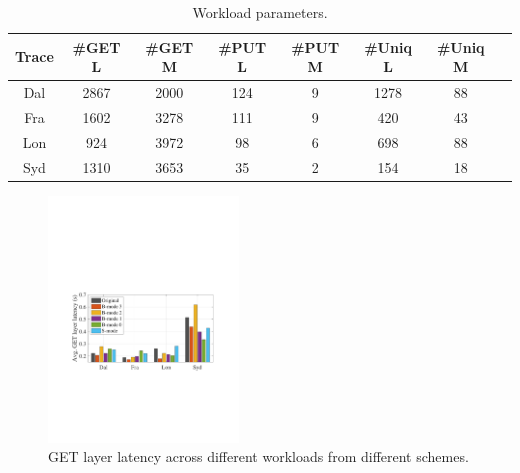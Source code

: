 
\begin{table}[h!]
	\scriptsize
	\caption{Workload parameters.}
	\begin{tabular}{| c | c | c | c | c | c | c| c |} 
		\hline
	Trace    &   \#GET L & \#GET M & \#PUT L & \#PUT M & \#Uniq L & \#Uniq M \\ 
		\hline\hline
		Dal    &  2867  & 2000   & 124  & 9     & 1278 & 88      \\ 
		\hline
		Fra     &  1602  & 3278   & 111  & 9     & 420 & 43     \\
		\hline
		Lon    &  924    & 3972   & 98  & 6      & 698 & 88    \\
		\hline 
		Syd      &  1310   & 3653   & 35 & 2     & 154 & 18      \\  
		\hline
	\end{tabular}

\label{tab:eval-overall}
\end{table}


%	


\begin{figure}[t]
	\centering
	\includegraphics[width=0.45\textwidth]{graphs/get-layer-latency.pdf}
	\caption{GET layer latency across different workloads from different schemes.}
	\label{fig:getlayerlatency}
	
\end{figure}

